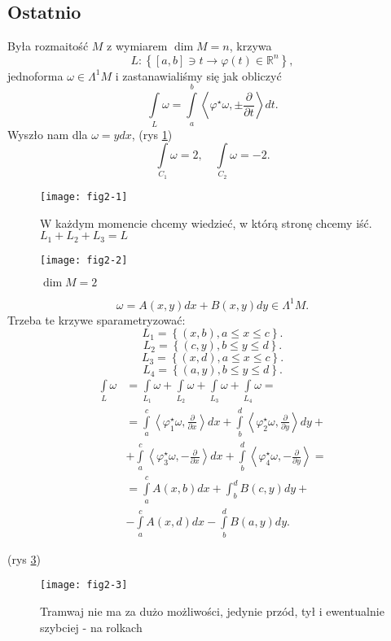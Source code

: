 \documentclass[../main.tex]{subfiles}
\begin{document}
    \subsection{Ostatnio}
    Była rozmaitość $M$ z wymiarem $\dim M = n$, krzywa
    \[
        L : \left\{ [a,b]\ni t \to \varphi(t)\in \mathbb{R}^n \right\}
    ,\]
jednoforma $\omega \in \Lambda^1M$ i zastanawialiśmy się jak obliczyć
\[
\int\limits_L\omega = \int\limits_a^b\left<\varphi^\star \omega, \pm\frac{\partial }{\partial t}  \right>dt
.\]
Wyszło nam dla $\omega = ydx$, (rys \ref{fig:fig2-1})
 \[
\int\limits_{C_1}\omega = 2,\quad \int\limits_{C_2}\omega = -2
.\]
\begin{figure}[h]
    \centering
    \texttt{[image: fig2-1]}
    \caption{W każdym momencie chcemy wiedzieć, w którą stronę chcemy iść. $L_1 + L_2 + L_3 = L$}
    \label{fig:fig2-1}
\end{figure}
\begin{przyklad}
    \begin{figure}[h]
        \centering
        \texttt{[image: fig2-2]}
        \caption{$\dim M = 2$}
        \label{fig:fig2-2}
    \end{figure}
    \[
        \omega = A(x,y)dx + B(x,y)dy\in \Lambda^1M
    .\]
Trzeba te krzywe sparametryzować:
\[
    L_1 = \left\{ (x,b), a \le x \le c \right\}
.\]
\[
    L_2 = \left\{ (c,y), b \le y \le d \right\}
.\]
\[
    L_3 = \left\{ (x,d), a \le x \le c \right\}
.\]
\[
    L_4 = \left\{ (a,y), b \le y \le d \right\}
.\]
\begin{align*}
    \int\limits_L\omega &= \int\limits_{L_1}\omega + \int\limits_{L_2}\omega + \int\limits_{L_3}\omega + \int\limits_{L_4}\omega =\\
    &= \int\limits_a^c\left<\varphi_1^\star\omega, \frac{\partial }{\partial x}  \right>dx + \int\limits_b^d\left<\varphi_2^\star \omega, \frac{\partial }{\partial y}  \right>dy + \\
    &+ \int\limits_a^c\left<\varphi^\star_3\omega, -\frac{\partial }{\partial x}  \right>dx + \int\limits_b^d\left<\varphi_4^\star \omega, -\frac{\partial }{\partial y}  \right> =\\
    &= \int\limits_a^c A(x,b)dx + \int_b^d B(c,y)dy +\\
    &- \int\limits_a^cA(x,d)dx - \int\limits_b^dB(a,y)dy
.\end{align*}
\end{przyklad}
(rys \ref{fig:fig2-3})\\
\begin{figure}[h]
    \centering
    \texttt{[image: fig2-3]}
    \caption{Tramwaj nie ma za dużo możliwości, jedynie przód, tył i ewentualnie szybciej - na rolkach}
    \label{fig:fig2-3}
\end{figure}
\end{document}

